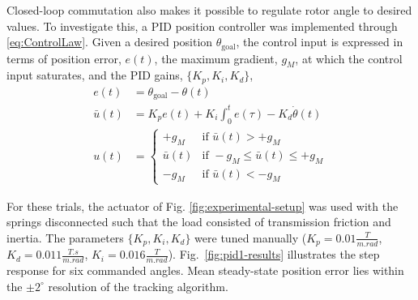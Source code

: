 \documentclass[journal]{IEEEtran}
\begin{document}
Closed-loop commutation also makes it possible to regulate rotor angle to desired values. To investigate this, a PID position controller was implemented through \eqref{eq:ControlLaw}. Given a desired position $\theta_{\textrm{goal}}$, the control input is expressed in terms of position error, $e(t)$, the maximum gradient, $g_M$, at which the control input saturates, and the PID gains, $\{K_p, K_i, K_d\}$,
   \begin{align}
e(t) &=\theta_{\textrm{goal}} - \theta(t)\nonumber \\
\bar{u}(t) &= K_{p}  e(t) + K_i\int_0^t e(\tau) - K_d \dot{\theta}(t) \nonumber \\
u(t) &= \begin{cases}
   +g_{M} & \text{if } \bar{u}(t) > +g_{M}   \\
   \bar{u}(t) & \text{if } -g_M \le \bar{u}(t) \le +g_{M}   \\
   -g_{M}      & \text{if } \bar{u}(t)  < -g_{M} 
  \end{cases}
\label{eq:positioncontrol}
   \end{align}

For these trials, the actuator of Fig. \ref{fig:experimental-setup} was used with the springs disconnected such that the load consisted of transmission friction and inertia. The parameters $\{K_p, K_i, K_d\}$ were tuned manually ($K_{p} = 0.01\frac{T}{m.rad}$, $K_d = 0.011\frac{T.s}{m.rad}$, $K_i = 0.016\frac{T}{m.rad}$). Fig.\ \ref{fig:pid1-results} illustrates the step response for six commanded angles. Mean steady-state position error lies within the $\pm2^\circ$ resolution of the tracking algorithm.  
\end{document}
